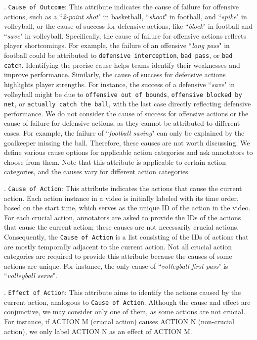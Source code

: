 . \texttt{Cause of Outcome}: 
This attribute indicates the cause of failure for offensive actions, such as a ``\textit{2-point shot}" in basketball, ``\textit{shoot}" in football, and ``\textit{spike}" in volleyball, or the cause of success for defensive actions, like ``\textit{block}" in football and ``\textit{save}" in volleyball. Specifically, the cause of failure for offensive actions reflects player shortcomings. For example, the failure of an offensive ``\textit{long pass}" in football could be attributed to \texttt{defensive interception}, \texttt{bad pass}, or \texttt{bad catch}. Identifying the precise cause helps teams identify their weaknesses and improve performance. Similarly, the cause of success for defensive actions highlights player strengths. For instance, the success of a defensive ``\textit{save}" in volleyball might be due to \texttt{offensive out of bounds}, \texttt{offensive blocked by net}, or \texttt{actually catch the ball}, with the last case directly reflecting defensive performance. We do not consider the cause of success for offensive actions or the cause of failure for defensive actions, as they cannot be attributed to different cases. For example, the failure of ``\textit{football saving}" can only be explained by the goalkeeper missing the ball. Therefore, these causes are not worth discussing. We define various cause options for applicable action categories and ask annotators to choose from them. Note that this attribute is applicable to certain action categories, and the causes vary for different action categories.

. \texttt{Cause of Action}: This attribute indicates the actions that cause the current action. Each action instance in a video is initially labeled with its time order, based on the start time, which serves as the unique ID of the action in the video. For each crucial action, annotators are asked to provide the IDs of the actions that cause the current action; these causes are not necessarily crucial actions. Consequently, the \texttt{Cause of Action} is a list consisting of the IDs of actions that are mostly temporally adjacent to the current action. Not all crucial action categories are required to provide this attribute because the causes of some actions are unique. For instance, the only cause of ``\textit{volleyball first pass}" is ``\textit{volleyball serve}".

. \texttt{Effect of Action}: This attribute aims to identify the actions caused by the current action, analogous to \texttt{Cause of Action}. Although the cause and effect are conjunctive, we may consider only one of them, as some actions are not crucial. For instance, if ACTION M (crucial action) causes ACTION N (non-crucial action), we only label ACTION N as an effect of ACTION M.

